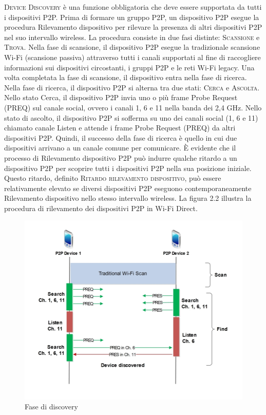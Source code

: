 \textsc{Device Discovery} è una funzione obbligatoria che deve essere supportata
da tutti i dispositivi P2P. Prima di formare un gruppo P2P, un dispositivo
P2P esegue la procedura Rilevamento dispositivo per rilevare la presenza di
altri dispositivi P2P nel suo intervallo wireless. La procedura consiste in
due fasi distinte: \textsc{Scansione} e \textsc{Trova}. Nella fase di scansione, il dispositivo
P2P esegue la tradizionale scansione Wi-Fi (scansione passiva) attraverso
tutti i canali supportati al fine di raccogliere informazioni sui dispositivi
circostanti, i gruppi P2P e le reti Wi-Fi legacy. Una volta completata la
fase di scansione, il dispositivo entra nella fase di ricerca. Nella
fase di ricerca, il dispositivo P2P si alterna tra due stati: \textsc{Cerca}
e \textsc{Ascolta}. Nello stato Cerca, il dispositivo P2P invia uno o più
frame Probe Request (PREQ)
sul canale social, ovvero i canali 1, 6 e 11 nella banda dei 2,4 GHz.
Nello stato di ascolto, il dispositivo P2P si sofferma su uno dei canali
social (1, 6 e 11) chiamato canale Listen e attende i frame Probe Request
(PREQ) da altri dispositivi P2P. Quindi, il successo della fase di ricerca
è quello in cui due dispositivi arrivano a un canale comune per comunicare.
È evidente che il processo di Rilevamento dispositivo P2P può indurre
qualche ritardo a un dispositivo P2P per scoprire tutti i
dispositivi P2P nella sua posizione iniziale. Questo ritardo, definito
\textsc{Ritardo rilevamento dispositivo}, può essere relativamente elevato se
diversi dispositivi P2P eseguono contemporaneamente Rilevamento dispositivo
nello stesso intervallo wireless. La figura 2.2 illustra la procedura di
rilevamento dei dispositivi P2P in Wi-Fi Direct.
\begin{figure}
\caption{Fase di discovery}
\includegraphics[width=1\columnwidth]{imgs/DeviceDiscovery.jpg} %
\end{figure}

